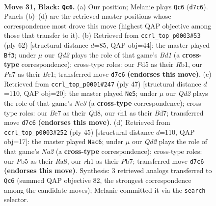 \documentclass[11pt]{article}
\begin{document}
\clearpage

\begin{figure}[p]\centering
\begin{subfigure}{0.46\textwidth}\centering
\resizebox{\linewidth}{!}{%
\newchessgame
\chessboard[
  setfen={6kr/pbrqb2p/n5pP/1p1p1pP1/3P1P2/1P2P3/4N3/R2QKBNR b KQ - 9 31},
  showmover=false,
  pgfstyle=straightmove, color=movearrow, markmove={d7-c6}
]}
\caption{}
\end{subfigure}\hfill
\begin{subfigure}{0.46\textwidth}\centering
\resizebox{\linewidth}{!}{%
\newchessgame
\chessboard[
  setfen={2r3k1/1rqnppbp/p2p1np1/3P4/N1p1PP2/7P/PPQ3PK/1R1BBR2 w - - 21 32},
  showmover=false,
  pgfstyle=straightmove, color=movearrow, markmove={d1-f3}
]}
\caption{}
\end{subfigure}
\\[4pt]
\begin{subfigure}{0.46\textwidth}\centering
\resizebox{\linewidth}{!}{%
\newchessgame
\chessboard[
  setfen={1r1q2k1/3b1pbp/2np2p1/pp1N4/7P/PBP1N1P1/1P1Q1P2/3R2K1 b - - 0 24},
  showmover=false,
  pgfstyle=straightmove, color=movearrow, markmove={c6-e5}
]}
\caption{}
\end{subfigure}\hfill
\begin{subfigure}{0.46\textwidth}\centering
\resizebox{\linewidth}{!}{%
\newchessgame
\chessboard[
  setfen={r6r/np1kbp2/4p3/1q1pP2N/1n1P3p/pP4P1/P2B1P1P/R2QNRK1 b - - 1 23},
  showmover=false,
  pgfstyle=straightmove, color=movearrow, markmove={a7-c6}
]}
\caption{}
\end{subfigure}
\caption{\textbf{Move 31, Black: \texttt{Qc6}.} (a) Our position; Melanie plays \texttt{Qc6} (\texttt{d7c6}). Panels (b)--(d) are the retrieved master positions whose correspondence most drove this move (highest QAP objective among those that transfer to it). (b) Retrieved from \texttt{ccrl\_top\_p0003\#53} (ply 62) [structural distance $d$=85, QAP obj=44]: the master played \texttt{Bf3}; under $\mu$ our \emph{Qd2} plays the role of that game's \emph{Bd1} (a \textbf{cross-type} correspondence); cross-type roles: our \emph{P}d5 as their \emph{R}b1, our \emph{P}a7 as their \emph{B}e1; transferred move \texttt{d7c6} \textbf{(endorses this move)}. (c) Retrieved from \texttt{ccrl\_top\_p0001\#247} (ply 47) [structural distance $d$=110, QAP obj=20]: the master played \texttt{Ne5}; under $\mu$ our \emph{Qd2} plays the role of that game's \emph{Nc3} (a \textbf{cross-type} correspondence); cross-type roles: our \emph{B}e7 as their \emph{Q}d8, our \emph{r}h1 as their \emph{B}d7; transferred move \texttt{d7c6} \textbf{(endorses this move)}. (d) Retrieved from \texttt{ccrl\_top\_p0003\#252} (ply 45) [structural distance $d$=110, QAP obj=17]: the master played \texttt{Nac6}; under $\mu$ our \emph{Qd2} plays the role of that game's \emph{Na2} (a \textbf{cross-type} correspondence); cross-type roles: our \emph{P}b5 as their \emph{R}a8, our \emph{r}h1 as their \emph{P}b7; transferred move \texttt{d7c6} \textbf{(endorses this move)}. Synthesis: 3 retrieved analogs transferred to \texttt{Qc6} (summed QAP objective 82, the strongest correspondence among the candidate moves); Melanie committed it via the \texttt{search} selector.}
\label{fig:thought-m61}
\end{figure}
\end{document}
